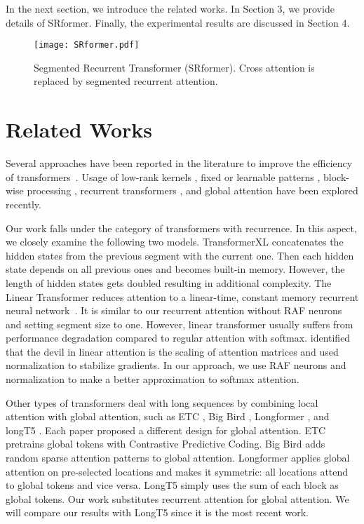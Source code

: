 \documentclass[11pt]{article}
\begin{document}
In the next section, we introduce the related works.  In Section 3, we provide details of SRformer. Finally, the experimental results are discussed in Section 4.


\begin{figure}
    \centering
    \texttt{[image: SRformer.pdf]}
    \caption{Segmented Recurrent Transformer (SRformer). Cross attention is replaced by segmented recurrent attention.}
    \label{fig:seq}
\end{figure}
\section{Related Works}
Several approaches have been reported in the literature to improve the efficiency of transformers~\citep{efficient}. Usage of low-rank kernels \citep{Linformer}, fixed or learnable patterns \citep{sparse,Axial,roy-etal-2021-efficient, Kitaev2020Reformer:}, block-wise processing \cite{xFormers2022,dao2022flashattention}, recurrent transformers \citep{transformerxl,transformerRNN}, and global attention  \citep{ETC,bigbird,Longformer,longt5} have been explored recently.





Our work falls under the category of transformers with recurrence. In this aspect, we closely examine the following two models. TransformerXL \citep{transformerxl} concatenates the hidden states from the previous segment with the current one. Then each hidden state depends on all previous ones and becomes built-in memory. However, the length of hidden states gets doubled resulting in additional complexity. The Linear Transformer reduces attention to a linear-time, constant memory recurrent neural network~\citep{transformerRNN}. It is similar to our recurrent attention without RAF neurons and setting segment size to one. However, linear transformer usually suffers from performance degradation compared to regular attention with softmax. \citet{qin-etal-2022-devil} identified that the devil in linear attention is the scaling of attention matrices and used normalization to stabilize gradients. In our approach, we use RAF neurons and normalization to make a better approximation to softmax attention. 


 
Other types of transformers deal with long sequences by combining local attention with global attention, such as ETC \citep{ETC}, Big Bird \citep{bigbird}, Longformer \citep{Longformer}, and longT5 \citep{longt5}. Each paper proposed a different design for global attention. ETC pretrains global tokens with Contrastive Predictive Coding. Big Bird adds random sparse attention patterns to global attention. Longformer applies global attention on pre-selected locations and makes it symmetric: all locations attend to global tokens and vice versa. LongT5 simply uses the sum of each block as global tokens. Our work substitutes recurrent attention for global attention. We will compare our results with LongT5 since it is the most recent work.
\end{document}
